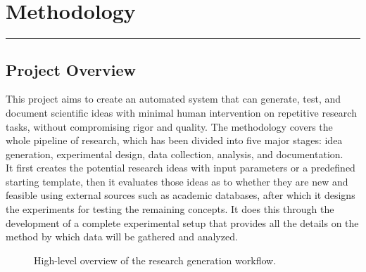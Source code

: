 \chapter{Methodology}
\vspace{-1.5cm}
\hspace{-1cm}\rule{19cm}{0.4pt} 

\section{Project Overview}
This project aims to create an automated system that can generate, test, and document scientific ideas with minimal human intervention on repetitive research tasks, without compromising rigor and quality. The methodology covers the whole pipeline of research, which has been divided into five major stages: idea generation, experimental design, data collection, analysis, and documentation.\\
It first creates the potential research ideas with input parameters or a predefined starting template, then it evaluates those ideas as to whether they are new and feasible using external sources such as academic databases, after which it designs the experiments for testing the remaining concepts. It does this through the development of a complete experimental setup that provides all the details on the method by which data will be gathered and analyzed.

\vspace{1cm}

\begin{figure}[h]
    \centering
    \caption{ High-level overview of the research generation workflow.}
    \label{fig:level1} %
\end{figure}

